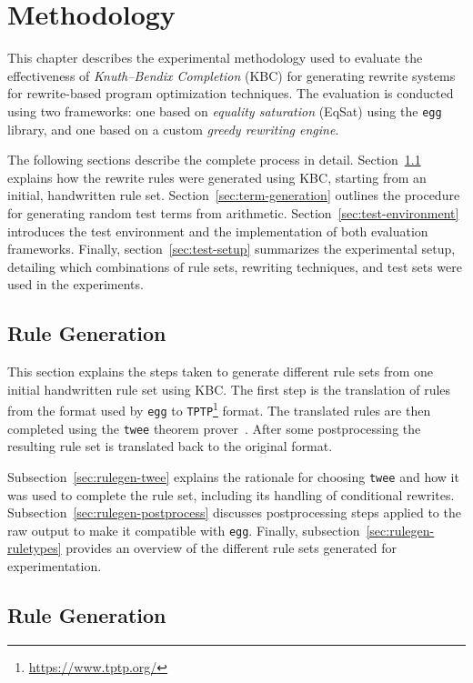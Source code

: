 \chapter{Methodology}
\label{chap:methods}

This chapter describes the experimental methodology used to evaluate the effectiveness of \textit{Knuth–Bendix Completion} (KBC) for generating rewrite systems for rewrite-based program optimization techniques. The evaluation is conducted using two frameworks: one based on \textit{equality saturation} (EqSat) using the \texttt{egg} library\citep{Willsey_2021}, and one based on a custom \textit{greedy rewriting engine}.

The following sections describe the complete process in detail. Section~\ref{sec:rule-generation} explains how the rewrite rules were generated using KBC, starting from an initial, handwritten rule set. Section~\ref{sec:term-generation} outlines the procedure for generating random test terms from arithmetic. Section~\ref{sec:test-environment} introduces the test environment and the implementation of both evaluation frameworks. Finally, section~\ref{sec:test-setup} summarizes the experimental setup, detailing which combinations of rule sets, rewriting techniques, and test sets were used in the experiments.

\section{Rule Generation}
\label{sec:rule-generation}
This section explains the steps taken to generate different rule sets from one initial handwritten rule set using KBC. The first step is the translation of rules from the format used by \texttt{egg} to \texttt{TPTP}\footnote{\url{https://www.tptp.org/}} format. The translated rules are then completed using the \texttt{twee} theorem prover~\citep{twee}. After some postprocessing the resulting rule set is translated back to the original format. 

Subsection~\ref{sec:rulegen-twee} explains the rationale for choosing \texttt{twee} and how it was used to complete the rule set, including its handling of conditional rewrites. Subsection~\ref{sec:rulegen-postprocess} discusses postprocessing steps applied to the raw output to make it compatible with \texttt{egg}. Finally, subsection~\ref{sec:rulegen-ruletypes} provides an overview of the different rule sets generated for experimentation.

\section{Rule Generation}

